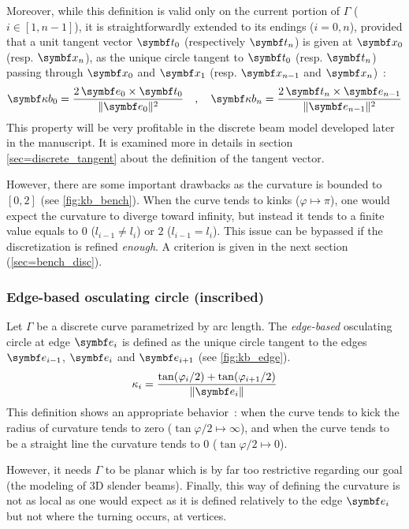 Moreover, while this definition is valid only on the current portion of $\Gamma$ ($i \in[1, n-1]$), it is straightforwardly extended to its endings ($i=0,n$), provided that a unit tangent vector $\vect{t}_{0}$ (respectively $\vect{t}_{n}$) is given at $\vect{x}_{0}$ (resp. $\vect{x}_{n}$), as the unique circle tangent to $\vect{t}_{0}$ (resp. $\vect{t}_{n}$) passing through $\vect{x}_0$ and $\vect{x}_1$ (resp. $\vect{x}_{n-1}$ and $\vect{x}_n$)~:
\begin{equation}
	\vect{\kappa b}_0 = \frac{2 \, \vect{e}_{0} \times \vect{t}_{0}}{\norm{\vect{e}_{0}}^2} 
	\quad , \quad
	\vect{\kappa b}_n = \frac{2 \, \vect{t}_{n} \times \vect{e}_{n-1}}{\norm{\vect{e}_{n-1}}^2} 
\end{equation}
This property will be very profitable in the discrete beam model developed later in the manuscript. It is examined more in details in section \cref{sec=discrete_tangent} about the definition of the tangent vector.

However, there are some important drawbacks as the curvature is bounded to $[0,2]$ (see \cref{fig:kb_bench}). When the curve tends to kinks ($\varphi \mapsto \pi$), one would expect the curvature to diverge toward infinity, but instead it tends to a finite value equals to $0$ ($l_{i-1} \neq l_i$) or $2$ ($l_{i-1} = l_i$). This issue can be bypassed if the discretization is refined \emph{enough}. A criterion is given in the next section (\cref{sec=bench_disc}).

\subsubsection{Edge-based osculating circle (inscribed)}
Let $\Gamma$ be a discrete curve parametrized by arc length. The \emph{edge-based} osculating circle at edge $\vect{e}_{i}$ is defined as the unique circle tangent to the edges $\vect{e}_{i-1}$, $\vect{e}_{i}$ and $\vect{e}_{i+1}$ (see \cref{fig:kb_edge}).
\begin{equation}
	\kappa_i = \frac{\tan(\varphi_i/2) + \tan(\varphi_{i+1}/2)}{\norm{\vect{e}_{i}}}
\label{eq:def_kb_edge}
\end{equation}
This definition shows an appropriate behavior~: when the curve tends to kick the radius of curvature tends to zero ($\tan \varphi/2 \mapsto \infty$), and when the curve tends to be a straight line the curvature tends to $0$ ($\tan \varphi/2 \mapsto 0$).

However, it needs $\Gamma$ to be planar which is by far too restrictive regarding our goal (the modeling of 3D slender beams). Finally, this way of defining the curvature is not as local as one would expect as it is defined relatively to the edge $\vect{e}_{i}$ but not where the turning occurs, at vertices.

